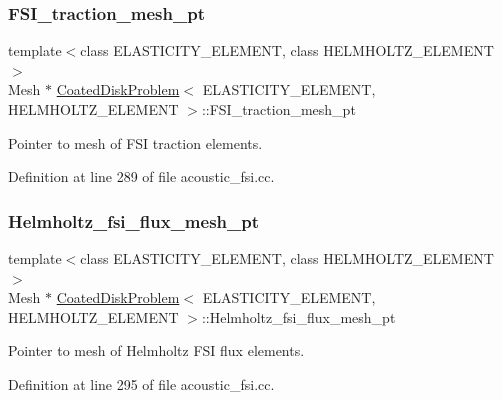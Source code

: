 \subsubsection{\texorpdfstring{F\+S\+I\+\_\+traction\+\_\+mesh\+\_\+pt}{FSI\_traction\_mesh\_pt}}
{\footnotesize\ttfamily template$<$class E\+L\+A\+S\+T\+I\+C\+I\+T\+Y\+\_\+\+E\+L\+E\+M\+E\+NT, class H\+E\+L\+M\+H\+O\+L\+T\+Z\+\_\+\+E\+L\+E\+M\+E\+NT$>$ \\
Mesh $\ast$ \hyperlink{classCoatedDiskProblem}{Coated\+Disk\+Problem}$<$ E\+L\+A\+S\+T\+I\+C\+I\+T\+Y\+\_\+\+E\+L\+E\+M\+E\+NT, H\+E\+L\+M\+H\+O\+L\+T\+Z\+\_\+\+E\+L\+E\+M\+E\+NT $>$\+::F\+S\+I\+\_\+traction\+\_\+mesh\+\_\+pt\hspace{0.3cm}{\ttfamily [private]}}



Pointer to mesh of F\+SI traction elements. 



Definition at line 289 of file acoustic\+\_\+fsi.\+cc.

\mbox{\label{classCoatedDiskProblem_a1737537bbd37b74915e3bfe43e3e4d3e}} 
\subsubsection{\texorpdfstring{Helmholtz\+\_\+fsi\+\_\+flux\+\_\+mesh\+\_\+pt}{Helmholtz\_fsi\_flux\_mesh\_pt}}
{\footnotesize\ttfamily template$<$class E\+L\+A\+S\+T\+I\+C\+I\+T\+Y\+\_\+\+E\+L\+E\+M\+E\+NT, class H\+E\+L\+M\+H\+O\+L\+T\+Z\+\_\+\+E\+L\+E\+M\+E\+NT$>$ \\
Mesh $\ast$ \hyperlink{classCoatedDiskProblem}{Coated\+Disk\+Problem}$<$ E\+L\+A\+S\+T\+I\+C\+I\+T\+Y\+\_\+\+E\+L\+E\+M\+E\+NT, H\+E\+L\+M\+H\+O\+L\+T\+Z\+\_\+\+E\+L\+E\+M\+E\+NT $>$\+::Helmholtz\+\_\+fsi\+\_\+flux\+\_\+mesh\+\_\+pt\hspace{0.3cm}{\ttfamily [private]}}



Pointer to mesh of Helmholtz F\+SI flux elements. 



Definition at line 295 of file acoustic\+\_\+fsi.\+cc.

